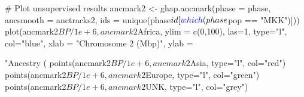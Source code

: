 \documentclass[
]{article}
\newenvironment{Shaded}{}{}
\newcommand{\CommentTok}[1]{\textcolor[rgb]{0.00,0.50,0.00}{#1}}
\newcommand{\DataTypeTok}[1]{#1}
\newcommand{\DecValTok}[1]{#1}
\newcommand{\FloatTok}[1]{#1}
\newcommand{\KeywordTok}[1]{\textcolor[rgb]{0.00,0.00,1.00}{#1}}
\newcommand{\NormalTok}[1]{#1}
\newcommand{\OperatorTok}[1]{#1}
\newcommand{\StringTok}[1]{\textcolor[rgb]{0.00,0.50,0.50}{#1}}
\begin{document}
\begin{Shaded}
\begin{Highlighting}[]
{\CommentTok{# Plot unsupervised results}
\NormalTok{ancmark2 <-}\StringTok{ }\KeywordTok{ghap.ancmark}\NormalTok{(}\DataTypeTok{phase =}\NormalTok{ phase, }\DataTypeTok{ancsmooth =}\NormalTok{ anctracks2,}
                         \DataTypeTok{ids =} \KeywordTok{unique}\NormalTok{(phase}\OperatorTok{$}\NormalTok{id[}\KeywordTok{which}\NormalTok{(phase}\OperatorTok{$}\NormalTok{pop }\OperatorTok{==}\StringTok{ "MKK"}\NormalTok{)]))}
\KeywordTok{plot}\NormalTok{(ancmark2}\OperatorTok{$}\NormalTok{BP}\OperatorTok{/}\FloatTok{1e+6}\NormalTok{, ancmark2}\OperatorTok{$}\NormalTok{Africa, }\DataTypeTok{ylim =} \KeywordTok{c}\NormalTok{(}\DecValTok{0}\NormalTok{,}\DecValTok{100}\NormalTok{), }\DataTypeTok{las=}\DecValTok{1}\NormalTok{, }\DataTypeTok{type=}\StringTok{"l"}\NormalTok{, }\DataTypeTok{col=}\StringTok{"blue"}\NormalTok{,}
     \DataTypeTok{xlab =} \StringTok{"Chromosome 2 (Mbp)"}\NormalTok{, }\DataTypeTok{ylab =} \StringTok{"Ancestry (%
\KeywordTok{points}\NormalTok{(ancmark2}\OperatorTok{$}\NormalTok{BP}\OperatorTok{/}\FloatTok{1e+6}\NormalTok{, ancmark2}\OperatorTok{$}\NormalTok{Asia, }\DataTypeTok{type=}\StringTok{"l"}\NormalTok{, }\DataTypeTok{col=}\StringTok{"red"}\NormalTok{)}
\KeywordTok{points}\NormalTok{(ancmark2}\OperatorTok{$}\NormalTok{BP}\OperatorTok{/}\FloatTok{1e+6}\NormalTok{, ancmark2}\OperatorTok{$}\NormalTok{Europe, }\DataTypeTok{type=}\StringTok{"l"}\NormalTok{, }\DataTypeTok{col=}\StringTok{"green"}\NormalTok{)}
\KeywordTok{points}\NormalTok{(ancmark2}\OperatorTok{$}\NormalTok{BP}\OperatorTok{/}\FloatTok{1e+6}\NormalTok{, ancmark2}\OperatorTok{$}\NormalTok{UNK, }\DataTypeTok{type=}\StringTok{"l"}\NormalTok{, }\DataTypeTok{col=}\StringTok{"grey"}\NormalTok{)}

}}
\end{Highlighting}
\end{Shaded}
\end{document}
